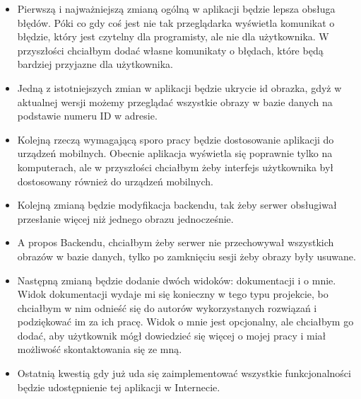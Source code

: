 \begin{itemize}
    \item Pierwszą i najważniejszą zmianą ogólną w aplikacji będzie lepsza obsługa błędów. Póki co gdy coś jest nie tak przeglądarka wyświetla komunikat o błędzie, który jest czytelny dla programisty, ale nie dla użytkownika. W przyszłości chciałbym dodać własne komunikaty o błędach, które będą bardziej przyjazne dla użytkownika.
    \item Jedną z istotniejszych zmian w aplikacji będzie ukrycie id obrazka, gdyż w aktualnej wersji możemy przeglądać wszystkie obrazy w bazie danych na podstawie numeru ID w adresie. 
    \item Kolejną rzeczą wymagającą sporo pracy będzie dostosowanie aplikacji do urządzeń mobilnych. Obecnie aplikacja wyświetla się poprawnie tylko na komputerach, ale w przyszłości chciałbym żeby interfejs użytkownika był dostosowany również do urządzeń mobilnych.
    \item Kolejną zmianą będzie modyfikacja backendu, tak żeby serwer obsługiwał przesłanie więcej niż jednego obrazu jednocześnie. 
    \item A propos Backendu, chciałbym żeby serwer nie przechowywał wszystkich obrazów w bazie danych, tylko po zamknięciu sesji żeby obrazy były usuwane.
    \item Następną zmianą będzie dodanie dwóch widoków: dokumentacji i o mnie. Widok dokumentacji wydaje mi się konieczny w tego typu projekcie, bo chciałbym w nim odnieść się do autorów wykorzystanych rozwiązań i podziękować im za ich pracę. Widok o mnie jest opcjonalny, ale chciałbym go dodać, aby użytkownik mógł dowiedzieć się więcej o mojej pracy i miał możliwość skontaktowania się ze mną.
    \item Ostatnią kwestią gdy już uda się zaimplementować wszystkie funkcjonalności będzie udostępnienie tej aplikacji w Internecie.
\end{itemize}